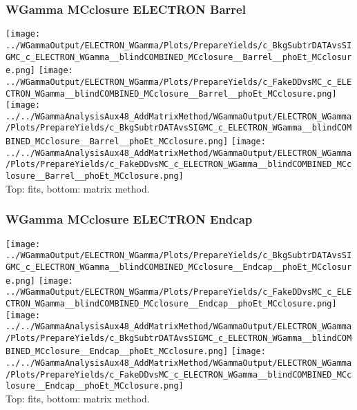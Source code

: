\documentclass{beamer}
\begin{document}
\begin{frame}\frametitle{WGamma MCclosure ELECTRON Barrel}
  \texttt{[image: ../WGammaOutput/ELECTRON\_WGamma/Plots/PrepareYields/c\_BkgSubtrDATAvsSIGMC\_c\_ELECTRON\_WGamma\_\_blindCOMBINED\_MCclosure\_\_Barrel\_\_phoEt\_MCclosure.png]} \texttt{[image: ../WGammaOutput/ELECTRON\_WGamma/Plots/PrepareYields/c\_FakeDDvsMC\_c\_ELECTRON\_WGamma\_\_blindCOMBINED\_MCclosure\_\_Barrel\_\_phoEt\_MCclosure.png]}\\
  \texttt{[image: ../../WGammaAnalysisAux48\_AddMatrixMethod/WGammaOutput/ELECTRON\_WGamma/Plots/PrepareYields/c\_BkgSubtrDATAvsSIGMC\_c\_ELECTRON\_WGamma\_\_blindCOMBINED\_MCclosure\_\_Barrel\_\_phoEt\_MCclosure.png]} \texttt{[image: ../../WGammaAnalysisAux48\_AddMatrixMethod/WGammaOutput/ELECTRON\_WGamma/Plots/PrepareYields/c\_FakeDDvsMC\_c\_ELECTRON\_WGamma\_\_blindCOMBINED\_MCclosure\_\_Barrel\_\_phoEt\_MCclosure.png]}\\
  \scriptsize Top: fits, bottom: matrix method.
\end{frame}

\begin{frame}\frametitle{WGamma MCclosure ELECTRON Endcap}
  \texttt{[image: ../WGammaOutput/ELECTRON\_WGamma/Plots/PrepareYields/c\_BkgSubtrDATAvsSIGMC\_c\_ELECTRON\_WGamma\_\_blindCOMBINED\_MCclosure\_\_Endcap\_\_phoEt\_MCclosure.png]} \texttt{[image: ../WGammaOutput/ELECTRON\_WGamma/Plots/PrepareYields/c\_FakeDDvsMC\_c\_ELECTRON\_WGamma\_\_blindCOMBINED\_MCclosure\_\_Endcap\_\_phoEt\_MCclosure.png]}\\
  \texttt{[image: ../../WGammaAnalysisAux48\_AddMatrixMethod/WGammaOutput/ELECTRON\_WGamma/Plots/PrepareYields/c\_BkgSubtrDATAvsSIGMC\_c\_ELECTRON\_WGamma\_\_blindCOMBINED\_MCclosure\_\_Endcap\_\_phoEt\_MCclosure.png]} \texttt{[image: ../../WGammaAnalysisAux48\_AddMatrixMethod/WGammaOutput/ELECTRON\_WGamma/Plots/PrepareYields/c\_FakeDDvsMC\_c\_ELECTRON\_WGamma\_\_blindCOMBINED\_MCclosure\_\_Endcap\_\_phoEt\_MCclosure.png]}\\
  \scriptsize Top: fits, bottom: matrix method.
\end{frame}

\end{document}
